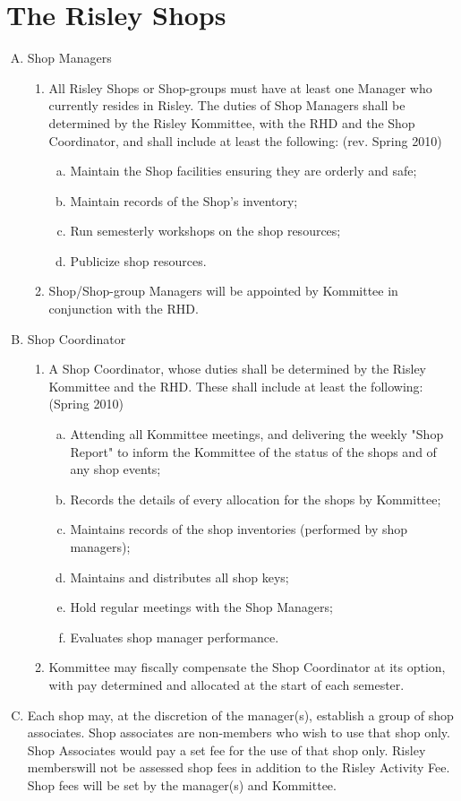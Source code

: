 \documentclass[12pt]{article}
\begin{document}
\section{The Risley Shops}
\begin{enumerate}[A.]
\item Shop Managers
\begin{enumerate}[1.]
\item All Risley Shops or Shop-groups must have at least one Manager who currently resides in Risley. The duties of Shop Managers shall be determined by the Risley Kommittee, with the RHD and the Shop Coordinator, and shall include at least the following: (rev. Spring 2010)
\begin{enumerate}[a.]
\item Maintain the Shop facilities ensuring they are orderly and safe;
\item Maintain records of the Shop's inventory;
\item Run semesterly workshops on the shop resources;
\item Publicize shop resources.
\end{enumerate}
\item Shop/Shop-group Managers will be appointed by Kommittee in conjunction with the RHD.
\end{enumerate}
\item Shop Coordinator
\begin{enumerate}[1.]
\item A Shop Coordinator, whose duties shall be determined by the Risley Kommittee and the RHD. These shall include at least the following: (Spring 2010)
\begin{enumerate}[a.]
\item Attending all Kommittee meetings, and delivering the weekly "Shop Report" to inform the Kommittee of the status of the shops and of any shop events;
\item Records the details of every allocation for the shops by Kommittee;
\item Maintains records of the shop inventories (performed by shop managers);
\item Maintains and distributes all shop keys;
\item Hold regular meetings with the Shop Managers;
\item Evaluates shop manager performance.
\end{enumerate}
\item Kommittee may fiscally compensate the Shop Coordinator at its option, with pay determined and allocated at the start of each semester.
\end{enumerate}
\item Each shop may, at the discretion of the manager(s), establish a group of shop associates. Shop associates are non-members who wish to use that shop only. Shop Associates would pay a set fee for the use of that shop only. Risley memberswill not be assessed shop fees in addition to the Risley Activity Fee. Shop fees will be set by the manager(s) and Kommittee.
\end{enumerate}
\end{document}
